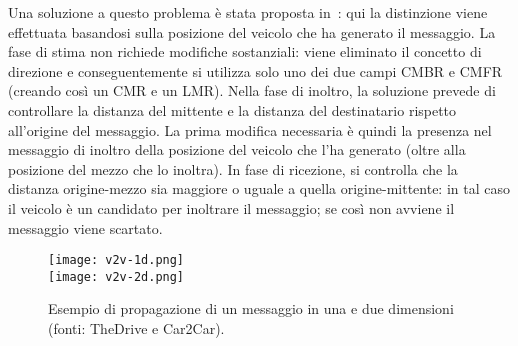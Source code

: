Una soluzione a questo problema è stata proposta in~\cite{Barichello2017propagazione}:
qui la distinzione viene effettuata basandosi sulla posizione del veicolo che ha generato il messaggio.
La fase di stima non richiede modifiche sostanziali: viene eliminato il concetto di direzione e conseguentemente si utilizza solo uno dei due campi CMBR e CMFR
(creando così un CMR e un LMR).
Nella fase di inoltro, la soluzione prevede di controllare la distanza del mittente e la distanza del destinatario rispetto all'origine del messaggio.
La prima modifica necessaria è quindi la presenza nel messaggio di inoltro della posizione del veicolo che l'ha generato (oltre alla posizione del mezzo che lo inoltra).
In fase di ricezione, si controlla che la distanza origine-mezzo sia maggiore o uguale a quella origine-mittente: in tal caso il veicolo è un candidato per inoltrare il messaggio;
se così non avviene il messaggio viene scartato.
%
\begin{figure}[htbp]
	\centering
		\texttt{[image: v2v-1d.png]} \\
		\vspace{7pt}
		\texttt{[image: v2v-2d.png]}
\caption{Esempio di propagazione di un messaggio in una e due dimensioni (fonti: TheDrive e Car2Car).\label{fig:v2v-1d-2d}}
\end{figure}
%
